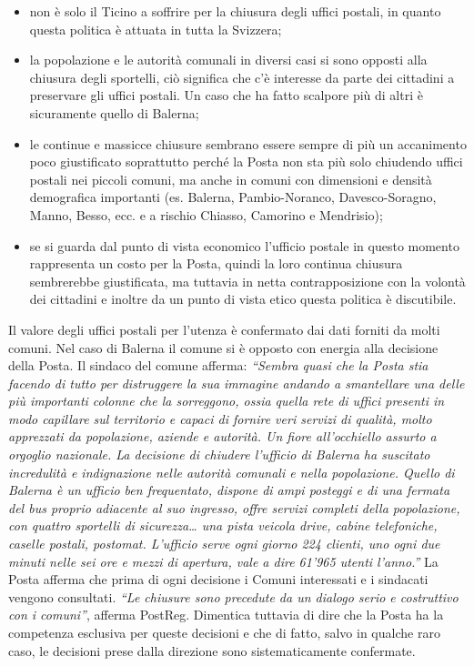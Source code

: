 \begin{itemize}
    \item non è solo il Ticino a soffrire per la chiusura degli uffici postali, in quanto questa politica è attuata in tutta la Svizzera;
    \item la popolazione e le autorità comunali in diversi casi si sono opposti alla chiusura degli sportelli, ciò significa che c’è interesse da parte dei cittadini a preservare gli uffici postali. Un caso che ha fatto scalpore più di altri è sicuramente quello di Balerna;
    \item le continue e massicce chiusure sembrano essere sempre di più un accanimento poco giustificato soprattutto perché la Posta non sta più solo chiudendo uffici postali nei piccoli comuni, ma anche in comuni con dimensioni e densità demografica importanti (es. Balerna, Pambio-Noranco, Davesco-Soragno, Manno, Besso, ecc. e a rischio Chiasso, Camorino e Mendrisio);
    \item se si guarda dal punto di vista economico l’ufficio postale in questo momento rappresenta un costo per la Posta, quindi la loro continua chiusura sembrerebbe giustificata, ma tuttavia in netta contrapposizione con la volontà dei cittadini e inoltre da un punto di vista etico questa politica è discutibile.
\end{itemize}
Il valore degli uffici postali per l’utenza è confermato dai dati forniti da molti comuni. Nel caso di Balerna il comune si è opposto con energia alla decisione della Posta. Il sindaco del comune afferma: \textit{“Sembra quasi che la Posta stia facendo di tutto per distruggere la sua immagine andando a smantellare una delle più importanti colonne che la sorreggono, ossia quella rete di uffici presenti in modo capillare sul territorio e capaci di fornire veri servizi di qualità, molto apprezzati da popolazione, aziende e autorità. Un fiore all’occhiello assurto a orgoglio nazionale. La decisione di chiudere l’ufficio di Balerna ha suscitato incredulità e indignazione nelle autorità comunali e nella popolazione. Quello di Balerna è un ufficio ben frequentato, dispone di ampi posteggi e di una fermata del bus proprio adiacente al suo ingresso, offre servizi completi della popolazione, con quattro sportelli di sicurezza… una pista veicola drive, cabine telefoniche, caselle postali, postomat. L’ufficio serve ogni giorno 224 clienti, uno ogni due minuti nelle sei ore e mezzi di apertura, vale a dire 61'965 utenti l’anno.”}
La Posta afferma che prima di ogni decisione i Comuni interessati e i sindacati vengono consultati. \textit{“Le chiusure sono precedute da un dialogo serio e costruttivo con i comuni”}, afferma PostReg. Dimentica tuttavia di dire che la Posta ha la competenza esclusiva per queste decisioni e che di fatto, salvo in qualche raro caso, le decisioni prese dalla direzione sono sistematicamente confermate.

